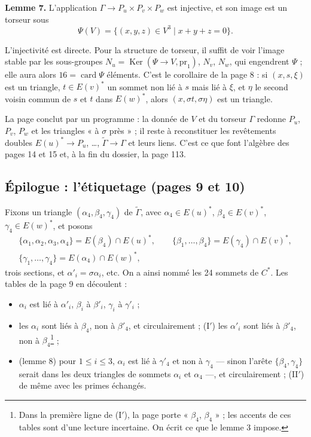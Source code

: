 \documentclass[11pt,a4paper]{article}
\begin{document}
\textbf{Lemme 7.} L'application $\Gamma \to P_u \times P_v \times P_w$ est
injective, et son image est un torseur sous
\[
\Psi(V) = \lbrace (x, y, z) \in V^3 \mid x + y + z = 0\rbrace .
\]

L'injectivité est directe. Pour la structure de torseur, il suffit de voir
l'image stable par les sous-groupes $N_u = \operatorname{Ker}(\Psi \to V,
\mathrm{pr}_1)$, $N_v$, $N_w$, qui engendrent $\Psi$ ; elle aura alors $16 =
\operatorname{card} \Psi$ éléments. C'est le corollaire de la page 8 : si
$(x, s, \xi)$ est un triangle, $t \in E(v)^*$ un sommet non lié à $s$ mais lié
à $\xi$, et $\eta$ le second voisin commun de $s$ et $t$ dans $E(w)^*$, alors
$(x, \sigma t, \sigma \eta)$ est un triangle.

La page conclut par un programme : la donnée de $V$ et du torseur $\Gamma$
redonne $P_u$, $P_v$, $P_w$ et les triangles « à $\sigma$ près » ; il reste à
reconstituer les revêtements doubles $E(u)^* \to P_u$, \ldots,
$\widetilde\Gamma \to \Gamma$ et leurs liens. C'est ce que font l'algèbre des
pages 14 et 15 et, à la fin du dossier, la page 113.

\subsection*{Épilogue : l'étiquetage (pages 9 et 10)}

Fixons un triangle $(\alpha_4, \beta_4, \gamma_4)$ de $\widetilde\Gamma$, avec
$\alpha_4 \in E(u)^*$, $\beta_4 \in E(v)^*$, $\gamma_4 \in E(w)^*$, et posons
\[
\begin{gathered}
\lbrace \alpha_1, \alpha_2, \alpha_3, \alpha_4\rbrace = E(\beta_4) \cap
E(u)^*, \qquad \lbrace \beta_1, \ldots, \beta_4\rbrace = E(\gamma_4) \cap
E(v)^*, \\ \lbrace \gamma_1, \ldots, \gamma_4\rbrace = E(\alpha_4) \cap
E(w)^*,
\end{gathered}
\]
trois sections, et $\alpha'_i = \sigma\alpha_i$, etc. On a ainsi nommé les 24
sommets de $C^*$. Les tables de la page 9 en découlent :

\begin{itemize}
\item[(0)] $\alpha_i$ est lié à $\alpha'_i$, $\beta_i$ à $\beta'_i$, $\gamma_i$
  à $\gamma'_i$ ;
\item[(I)] les $\alpha_i$ sont liés à $\beta_4$, non à $\beta'_4$, et
  circulairement ; (I$'$) les $\alpha'_i$ sont liés à $\beta'_4$, non à
  $\beta_4$\footnote{Dans la première ligne de (I$'$), la page porte
  « $\beta_4$, $\beta_4$ » ; les accents de ces tables sont d'une lecture
  incertaine. On écrit ce que le lemme 3 impose.} ;
\item[(II)] (lemme 8) pour $1 \leq i \leq 3$, $\alpha_i$ est lié à
  $\gamma'_4$ et non à $\gamma_4$ --- sinon l'arête $\lbrace \beta_4,
  \gamma_4\rbrace$ serait dans les deux triangles de sommets $\alpha_i$ et
  $\alpha_4$ ---, et circulairement ; (II$'$) de même avec les primes
  échangés.
\end{itemize}
\end{document}
